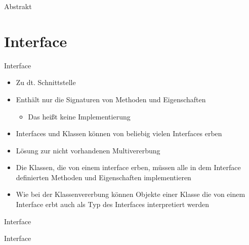 \begin{frame}{Abstrakt}
	
\end{frame}

\section{Interface}
\begin{frame}{Interface}
	\begin{itemize}
		\item Zu dt. Schnittstelle
		\item Enthält nur die \alert{Signaturen} von Methoden und Eigenschaften
		\begin{itemize}
			\item Das heißt keine Implementierung
		\end{itemize}
		\item Interfaces und Klassen können von beliebig vielen Interfaces erben
		\item Lösung zur nicht vorhandenen Multivererbung
		\item Die Klassen, die von einem \alert{interface} erben, müssen alle in dem Interface definierten Methoden und Eigenschaften implementieren
		\item Wie bei der Klassenvererbung können Objekte einer Klasse die von einem Interface erbt auch als Typ des Interfaces interpretiert werden
	\end{itemize}
\end{frame}

\begin{frame}{Interface}
	
\end{frame}

\begin{frame}{Interface}
	
\end{frame}

